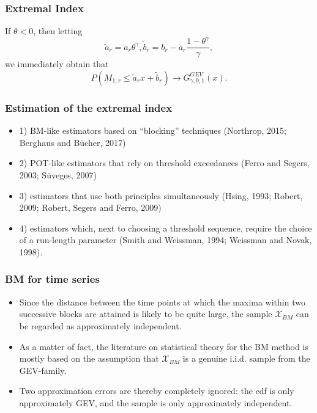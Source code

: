 \documentclass{beamer}
\newcommand{\suit}[1]{\left(#1\right)}
\begin{document}
\begin{frame}
    \frametitle{Extremal Index}
If $\theta<0$, then letting
$$
\tilde{a}_r =a_r\theta^{\gamma}, \tilde{b}_r=b_r-a_r\frac{1-\theta^{\gamma}}{\gamma},
$$
we immediately obtain that
$$
P\suit{M_{1,r}\le \tilde{a}_r x+\tilde{b}_r}\to G^{GEV}_{\gamma,0,1}(x).
$$
\end{frame}

\begin{frame}
    \frametitle{Estimation of the extremal index}
\begin{itemize}
    \item 1) BM-like estimators based on “blocking”
    techniques (Northrop, 2015; Berghaus and Bücher, 2017)
    \item 2) POT-like estimators that rely on
    threshold exceedances (Ferro and Segers, 2003; Süveges, 2007)
    \item  3) estimators that use both principles simultaneously (Hsing, 1993; Robert, 2009; Robert, Segers and Ferro, 2009)
    \item 4) estimators which, next to choosing a threshold sequence, require the choice of a run-length parameter
    (Smith and Weissman, 1994; Weissman and Novak, 1998).
\end{itemize}
\end{frame}


\begin{frame}
    \frametitle{BM for time series}
\begin{itemize}
    \item Since the distance between the time points at which the maxima within two successive blocks
    are attained is likely to be quite large, the sample $\mathcal{X}_{BM}$ can be regarded as approximately independent.
    \item As a matter of fact, the literature on statistical theory for the BM method is mostly
    based on the assumption that $\mathcal{X}_{BM}$ is a genuine i.i.d. sample from the GEV-family.
    \item Two approximation errors are thereby completely ignored: the cdf is only approximately
    GEV, and the sample is only approximately independent.
\end{itemize}
    

\end{frame}
\end{document}
